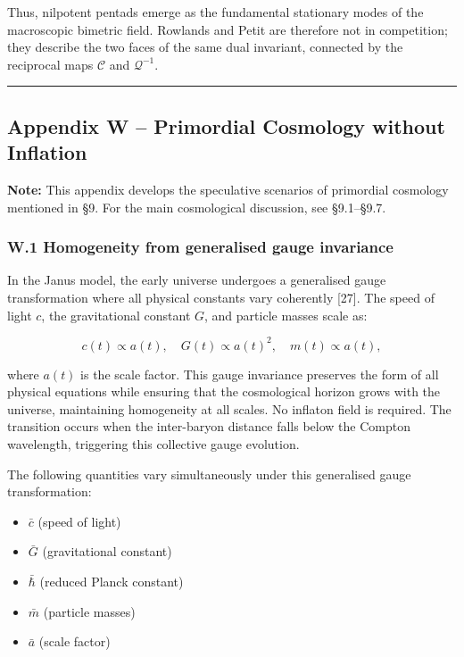 \documentclass[11pt]{article}
\providecommand{\tightlist}{\setlength{\itemsep}{2pt}\setlength{\parskip}{6pt}}
\let\oldmathcal\mathcal
\renewcommand{\mathcal}[1]{\oldmathcal{#1}}
\providecommand{\tightlist}{%
  \setlength{\itemsep}{2pt}\setlength{\parskip}{6pt}
}
\begin{document}
Thus, nilpotent pentads emerge as the fundamental stationary modes of
the macroscopic bimetric field. Rowlands and Petit are therefore not in
competition; they describe the two faces of the same dual invariant,
connected by the reciprocal maps \(\mathcal{C}\) and
\(\mathcal{Q}^{-1}\).

\begin{center}\rule{0.5\linewidth}{0.5pt}\end{center}

\hypertarget{appendix-w-primordial-cosmology-without-inflation}{%
\subsection{Appendix W -- Primordial Cosmology without
Inflation}\label{appendix-w-primordial-cosmology-without-inflation}}

\textbf{Note:} This appendix develops the speculative scenarios of
primordial cosmology mentioned in §9. For the main cosmological
discussion, see §9.1--§9.7.

\hypertarget{w.1-homogeneity-from-generalised-gauge-invariance}{%
\subsubsection{W.1 Homogeneity from generalised gauge
invariance}\label{w.1-homogeneity-from-generalised-gauge-invariance}}

In the Janus model, the early universe undergoes a generalised gauge
transformation where all physical constants vary coherently {[}27{]}.
The speed of light \(c\), the gravitational constant \(G\), and particle
masses scale as:

\[
c(t) \propto a(t), \quad G(t) \propto a(t)^2, \quad m(t) \propto a(t),
\]

where \(a(t)\) is the scale factor. This gauge invariance preserves the
form of all physical equations while ensuring that the cosmological
horizon grows with the universe, maintaining homogeneity at all scales.
No inflaton field is required. The transition occurs when the
inter-baryon distance falls below the Compton wavelength, triggering
this collective gauge evolution.

The following quantities vary simultaneously under this generalised
gauge transformation:

\begin{itemize}
\tightlist
\item
  \(\bar{c}\) (speed of light)
\item
  \(\bar{G}\) (gravitational constant)
\item
  \(\bar{\hbar}\) (reduced Planck constant)
\item
  \(\bar{m}\) (particle masses)
\item
  \(\bar{a}\) (scale factor)
\end{itemize}
\end{document}
